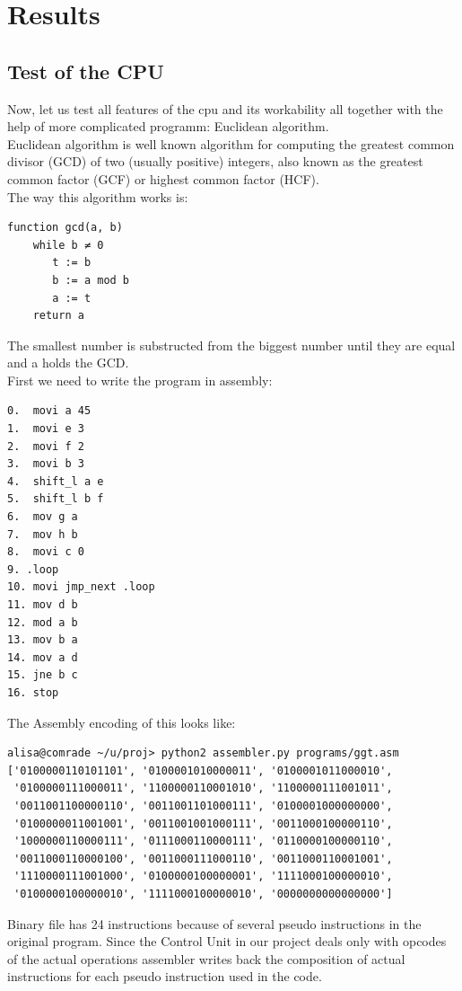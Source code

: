 \documentclass[11pt,a4paper]{article}
\begin{document}
\newpage
\section{Results}
\subsection{Test of the CPU}
Now, let us test all features of the cpu and its workability all together with the help of more complicated programm: Euclidean algorithm.\\
Euclidean algorithm is well known algorithm for computing the greatest common divisor (GCD) of two (usually positive) integers, also known as the greatest common factor (GCF) or highest common factor (HCF).\\
The way this algorithm works is:
\begin{verbatim}
function gcd(a, b)
    while b ≠ 0
       t := b
       b := a mod b
       a := t
    return a
\end{verbatim}
The smallest number is substructed from the biggest number until they are equal and a holds the GCD.\\
First we need to write the program in assembly:
\begin{verbatim}
0.  movi a 45
1.  movi e 3
2.  movi f 2
3.  movi b 3
4.  shift_l a e
5.  shift_l b f
6.  mov g a
7.  mov h b
8.  movi c 0
9. .loop
10. movi jmp_next .loop
11. mov d b
12. mod a b
13. mov b a
14. mov a d
15. jne b c
16. stop
\end{verbatim}
The Assembly encoding of this looks like:
\begin{verbatim}
alisa@comrade ~/u/proj> python2 assembler.py programs/ggt.asm
['0100000110101101', '0100001010000011', '0100001011000010',
 '0100000111000011', '1100000110001010', '1100000111001011',
 '0011001100000110', '0011001101000111', '0100001000000000',
 '0100000011001001', '0011001001000111', '0011000100000110',
 '1000000110000111', '0111000110000111', '0110000100000110',
 '0011000110000100', '0011000111000110', '0011000110001001',
 '1110000111001000', '0100000100000001', '1111000100000010',
 '0100000100000010', '1111000100000010', '0000000000000000']
\end{verbatim}
Binary file has 24 instructions because of several pseudo instructions in the original program. Since the Control Unit in our project deals only with opcodes of the actual operations assembler writes back the composition of actual instructions for each pseudo instruction used in the code.\\
\end{document}
